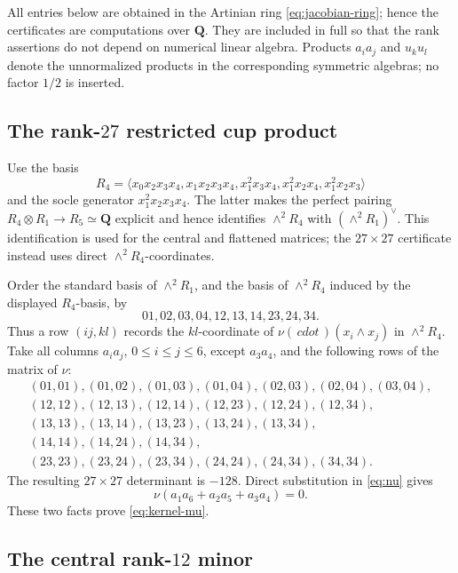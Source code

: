 \documentclass[11pt,reqno]{amsart}
\numberwithin{equation}{section}
\theoremstyle{definition}
\theoremstyle{remark}
\newcommand{\Q}{\mathbf Q}
\begin{document}
All entries below are obtained in the Artinian ring \eqref{eq:jacobian-ring}; hence the certificates are computations over $\Q$.  They are included in full so that the rank assertions do not depend on numerical linear algebra.  Products $a_i a_j$ and $u_k u_l$ denote the unnormalized products in the corresponding symmetric algebras; no factor $1/2$ is inserted.

\subsection{The rank-\texorpdfstring{$27$}{27} restricted cup product}

Use the basis
\[
R_4=\langle
x_0x_2x_3x_4,
x_1x_2x_3x_4,
x_1^2x_3x_4,
x_1^2x_2x_4,
x_1^2x_2x_3
\rangle
\]
and the socle generator $x_1^2x_2x_3x_4$.  The latter makes the perfect pairing
$R_4\otimes R_1\to R_5\simeq\Q$ explicit and hence identifies
$\wedge^2R_4$ with $(\wedge^2R_1)^\vee$.  This identification is used for the central and flattened matrices; the $27\times27$ certificate instead uses direct $\wedge^2R_4$-coordinates.

Order the standard basis of $\wedge^2R_1$, and the basis of $\wedge^2R_4$ induced by the displayed $R_4$-basis, by
\[
01,02,03,04,12,13,14,23,24,34.
\]
Thus a row $(ij,kl)$ records the $kl$-coordinate of
$\nu(\,cdot\,)(x_i\wedge x_j)$ in $\wedge^2R_4$.
Take all columns $a_i a_j$, $0\le i\le j\le6$, except $a_3a_4$, and the following rows of the matrix of $\nu$:
\begin{gather*}
(01,01),(01,02),(01,03),(01,04),(02,03),(02,04),(03,04),\\
(12,12),(12,13),(12,14),(12,23),(12,24),(12,34),\\
(13,13),(13,14),(13,23),(13,24),(13,34),\\
(14,14),(14,24),(14,34),\\
(23,23),(23,24),(23,34),(24,24),(24,34),(34,34).
\end{gather*}
The resulting $27\times27$ determinant is $-128$.  Direct substitution in \eqref{eq:nu} gives
\[
\nu(a_1a_6+a_2a_5+a_3a_4)=0.
\]
These two facts prove \eqref{eq:kernel-mu}.

\subsection{The central rank-\texorpdfstring{$12$}{12} minor}
\end{document}
